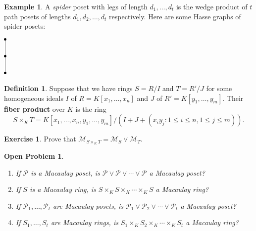 \documentclass[11pt]{amsart}
\newcommand{\M}{{\mathcal M}}
\renewcommand{\P}{{\mathcal P}}
\theoremstyle{plain} %
\newtheorem{oprobl}{Open Problem}
\theoremstyle{definition}
\newtheorem{defn}[thm]{Definition}
\newtheorem{ex}[thm]{Example}
\newtheorem{exer}[thm]{Exercise}
\theoremstyle{remark}
\numberwithin{equation}{section}  %
\begin{document}
\begin{ex}\label{ex: spider poset}
A {\em spider} poset with legs of length $d_1,\ldots, d_t$ is the wedge product of $t$ path posets of lengths $d_1, d_2, \ldots, d_t$ respectively. Here are some Hasse graphs of spider posets:
\begin{center}
\includegraphics[height=1.95cm]{Pictures/Spider_legs_1_length_2.pdf}
\qquad 
{}
\qquad 
{}
\end{center}
\end{ex}

\begin{tcolorbox}
\begin{defn}
Suppose that we have rings $S = R/I$  and $T=R'/J$ for some homogeneous ideals $I$ of $R = K[x_1,\ldots, x_n]$ and $J$ of $R'=K[y_1, \ldots, y_m]$. Their  {\bf fiber product} over $K$ is the ring
\[
S\times_K T= K[x_1,\ldots, x_n, y_1, \ldots, y_m]/ (I +J + (x_iy_j: 1\leq i\leq n, 1\leq j\leq m)).
\]
\end{defn}
\end{tcolorbox}

\begin{tcolorbox}[reset]
\begin{exer}
Prove that $\M_{S\times_K T}=\M_S\vee \M_T$.
\end{exer}
\end{tcolorbox}

\begin{tcolorbox}[reset]
\begin{oprobl}\label{oprobl 2}
\begin{enumerate}
\item If $\P$ is a Macaulay poset,  is $\P\vee \P\vee \cdots \vee \P$ a Macaulay poset?
\item If $S$ is a Macaulay ring, is  $S\times_K S\times_K \cdots \times_K S$  a Macaulay ring?
\item If $\P_1, \ldots, \P_t$ are Macaulay posets,  is $\P_1\vee \P_2\vee \cdots \vee \P_t$ a Macaulay poset?
\item If $S_1, \ldots, S_t$ are Macaulay rings,  is $S_1\times_K S_2\times_K \cdots \times_K S_t$ a Macaulay ring?
\end{enumerate}
\end{oprobl}
\end{tcolorbox}
\end{document}

